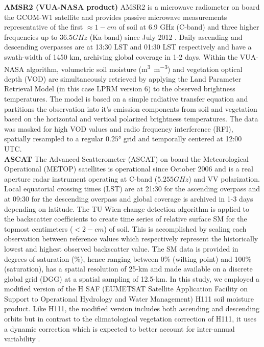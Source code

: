 \documentclass[hess, manuscript]{copernicus}
\begin{document}
\textbf{AMSR2 (VUA-NASA product)}
AMSR2 is a microwave radiometer on board the GCOM-W1 satellite and provides passive microwave measurements representative of the first $\approx 1-cm$ of soil at 6.9 GHz (C-band) and three higher frequencies up to $36.5 GHz$ (Ka-band) since July 2012 \citep{Imaoka2010}. Daily ascending and descending overpasses are at 13:30 LST and 01:30 LST respectively and have a swath-width of 1450 km, archiving global coverage in 1-2 days. Within the VUA-NASA algorithm, volumetric soil moisture (\si{\m^{3}.\m^{-3}}) and vegetation optical depth (VOD) are simultaneously retrieved by applying the Land Parameter Retrieval Model \citep{Owe2008} (in this case LPRM version 6) to the observed brightness temperatures. The model is based on a simple radiative transfer equation and partitions the observation into it's emission components from soil and vegetation based on the horizontal and vertical polarized brightness temperatures. The data was masked for high VOD values and radio frequency interference (RFI), spatially resampled to a regular $0.25 \si{\degree}$ grid and temporally centered at 12:00 UTC.\\

\textbf{ASCAT}
The Advanced Scatterometer (ASCAT) on board the Meteorological Operational (METOP) satellites is operational since October 2006 and is a real aperture radar instrument operating at C-band ($5.255 GHz$) and VV polarization. Local equatorial crossing times (LST) are at 21:30 for the ascending overpass and at 09:30 for the descending overpass and global coverage is archived in 1-3 days depending on latitude. The TU Wien change detection algorithm \citep{wagner1999method, naeimi2009improved} is applied to the backscatter coefficients to create time series of relative surface SM for the topmost centimeters ($< 2-cm$) of soil. This is accomplished by scaling each observation between reference values which respectively represent the historically lowest and highest observed backscatter value. The SM data is provided in degrees of saturation (\%), hence ranging between 0\% (wilting point) and 100\% (saturation), has a spatial resolution of 25-km and made available on a discrete global grid (DGG) at a spatial sampling of 12.5-km. In this study, we employed a modified version of the H SAF (EUMETSAT Satellite Application Facility on Support to Operational Hydrology and Water Management) H111 soil moisture product. Like H111, the modified version includes both ascending and descending orbits but in contrast to the climatological vegetation correction of H111, it uses a dynamic correction which is expected to better account for inter-annual variability \citep{Hahn2017,Vreugdenhil2016}.
\end{document}
